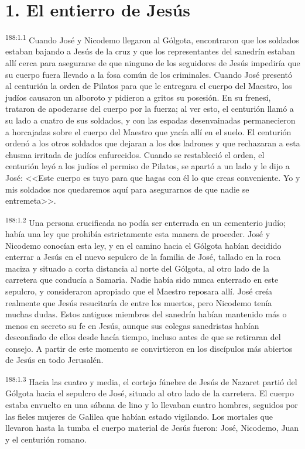 \section*{1. El entierro de Jesús}
\par 
\textsuperscript{188:1.1} Cuando José y Nicodemo llegaron al Gólgota, encontraron que los soldados estaban bajando a Jesús de la cruz y que los representantes del sanedrín estaban allí cerca para asegurarse de que ninguno de los seguidores de Jesús impediría que su cuerpo fuera llevado a la fosa común de los criminales. Cuando José presentó al centurión la orden de Pilatos para que le entregara el cuerpo del Maestro, los judíos causaron un alboroto y pidieron a gritos su posesión. En su frenesí, trataron de apoderarse del cuerpo por la fuerza; al ver esto, el centurión llamó a su lado a cuatro de sus soldados, y con las espadas desenvainadas permanecieron a horcajadas sobre el cuerpo del Maestro que yacía allí en el suelo. El centurión ordenó a los otros soldados que dejaran a los dos ladrones y que rechazaran a esta chusma irritada de judíos enfurecidos. Cuando se restableció el orden, el centurión leyó a los judíos el permiso de Pilatos, se apartó a un lado y le dijo a José: <<Este cuerpo es tuyo para que hagas con él lo que creas conveniente. Yo y mis soldados nos quedaremos aquí para asegurarnos de que nadie se entremeta>>.

\par 
\textsuperscript{188:1.2} Una persona crucificada no podía ser enterrada en un cementerio judío; había una ley que prohibía estrictamente esta manera de proceder. José y Nicodemo conocían esta ley, y en el camino hacia el Gólgota habían decidido enterrar a Jesús en el nuevo sepulcro de la familia de José, tallado en la roca maciza y situado a corta distancia al norte del Gólgota, al otro lado de la carretera que conducía a Samaria. Nadie había sido nunca enterrado en este sepulcro, y consideraron apropiado que el Maestro reposara allí. José creía realmente que Jesús resucitaría de entre los muertos, pero Nicodemo tenía muchas dudas. Estos antiguos miembros del sanedrín habían mantenido más o menos en secreto su fe en Jesús, aunque sus colegas sanedristas habían desconfiado de ellos desde hacía tiempo, incluso antes de que se retiraran del consejo. A partir de este momento se convirtieron en los discípulos más abiertos de Jesús en todo Jerusalén.

\par 
\textsuperscript{188:1.3} Hacia las cuatro y media, el cortejo fúnebre de Jesús de Nazaret partió del Gólgota hacia el sepulcro de José, situado al otro lado de la carretera. El cuerpo estaba envuelto en una sábana de lino y lo llevaban cuatro hombres, seguidos por las fieles mujeres de Galilea que habían estado vigilando. Los mortales que llevaron hasta la tumba el cuerpo material de Jesús fueron: José, Nicodemo, Juan y el centurión romano.

